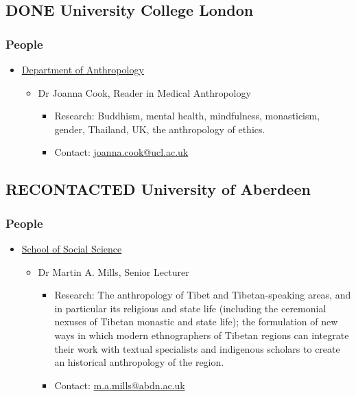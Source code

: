 \documentclass[11pt]{article}
\begin{document}
\subsection*{{\bfseries\sffamily DONE} University College London}
\label{sec:orgcf5b62e}
\subsubsection*{People}
\label{sec:org1800dd9}
\begin{itemize}
\item \href{https://www.ucl.ac.uk/anthropology/ucl-anthropology}{Department of Anthropology}
\label{sec:orgd2edbcb}
\begin{itemize}
\item Dr Joanna Cook, Reader in Medical Anthropology
\label{sec:org3452bcb}
\begin{itemize}
\item Research: Buddhism, mental health, mindfulness, monasticism, gender, Thailand, UK, the anthropology of ethics.\\
\item Contact: \href{mailto:joanna.cook@ucl.ac.uk}{joanna.cook@ucl.ac.uk}\\
\end{itemize}
\end{itemize}
\end{itemize}
\subsection*{{\bfseries\sffamily RECONTACTED} University of Aberdeen}
\label{sec:org2485461}
\subsubsection*{People}
\label{sec:orgd4867b4}
\begin{itemize}
\item \href{https://www.abdn.ac.uk/socsci/}{School of Social Science}
\label{sec:org486a041}
\begin{itemize}
\item Dr Martin A. Mills, Senior Lecturer
\label{sec:orgb4eda7e}
\begin{itemize}
\item Research: The anthropology of Tibet and Tibetan-speaking areas, and in particular its religious and state life (including the ceremonial nexuses of Tibetan monastic and state life); the formulation of new ways in which modern ethnographers of Tibetan regions can integrate their work with textual specialists and indigenous scholars to create an historical anthropology of the region.\\
\item Contact: \href{mailto:m.a.mills@abdn.ac.uk}{m.a.mills@abdn.ac.uk}\\
\end{itemize}
\end{itemize}
\end{itemize}
\end{document}
